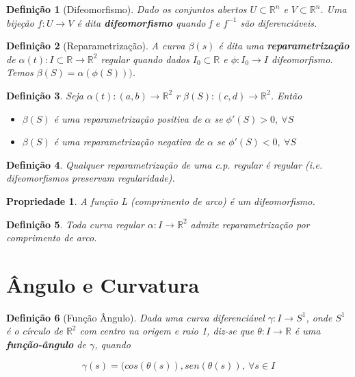 \documentclass{article}
\newtheorem{prop}{Propriedade}
\newtheorem{definition}{Definição}
\begin{document}
\begin{definition}[Difeomorfismo]
Dado os conjuntos abertos $U \subset \mathbb{R}^n$ e $V \subset \mathbb{R}^n$. Uma bijeção $f: U \rightarrow V$ é dita \textbf{difeomorfismo} quando f e $f^{-1}$ são diferenciáveis.
\end{definition}

\begin{definition}[Reparametrização]
A curva $\beta(s)$ é dita uma \textbf{reparametrização} de $\alpha(t): I \subset \mathbb{R} \rightarrow \mathbb{R}^2$ regular quando dados $I_0 \subset \mathbb{R}$ e $\phi: I_0 \rightarrow I$ difeomorfismo. Temos $\beta(S) = \alpha(\phi(S)))$.
\end{definition}

\begin{definition}
Seja $\alpha(t): (a, b) \rightarrow \mathbb{R}^2$ r $\beta(S): (c, d) \rightarrow \mathbb{R}^2$. Então

\begin{itemize}
    \item $\beta(S)$ é uma reparametrização positiva de $\alpha$ se $\phi'(S) > 0,\ \forall S$
    \item $\beta(S)$ é uma reparametrização negativa de $\alpha$ se $\phi'(S) < 0,\ \forall S$
\end{itemize}
\end{definition}

\begin{definition}
Qualquer reparametrização de uma c.p. regular é regular (i.e. difeomorfismos preservam regularidade).
\end{definition}

\begin{prop}
A função L (comprimento de arco) é um difeomorfismo.
\end{prop}

\begin{definition}
Toda curva regular $\alpha: I \rightarrow \mathbb{R}^2$ admite reparametrização por comprimento de arco.
\end{definition}

\section*{Ângulo e Curvatura}
\label{s3}

\begin{definition}[Função Ângulo]
Dada uma curva diferenciável $\gamma: I \rightarrow S^1$, onde $S^1$ é o círculo de $\mathbb{R}^2$ com centro na origem e raio 1, diz-se que $\theta: I \rightarrow \mathbb{R}$ é uma \textbf{função-ângulo} de $\gamma$, quando

$$\gamma(s) = (cos(\theta(s)), sen(\theta(s)),\ \forall s \in I$$
\end{definition}
\end{document}
